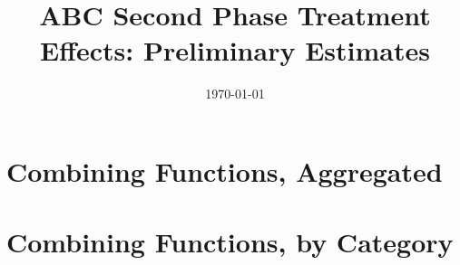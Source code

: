 
 

\title{ABC Second Phase Treatment Effects: Preliminary Estimates} 

\date{\today} 

 

\maketitle 

\tableofcontents 

\clearpage 


\def\arraystretch{0.6}

\setlength\tabcolsep{0.3em}

\section{{Combining Functions, Aggregated}}


\begin{center}
	
\end{center}

\begin{center}
	
\end{center}

\begin{center}
	
\end{center}
\section{{Combining Functions, by Category}}


\begin{center}
	
\end{center}

\begin{center}
	
\end{center}

\begin{center}
	
\end{center}

\begin{center}
	
\end{center}

\begin{center}
	
\end{center}

